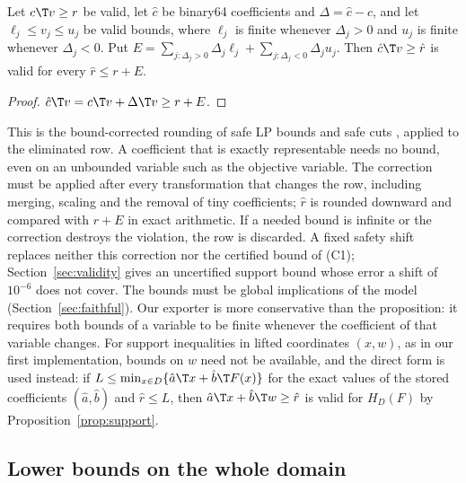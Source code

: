 \begin{proposition}\label{prop:export}
Let $c\T v\ge r$ be valid, let $\hat c$ be binary64 coefficients and
$\Delta=\hat c-c$, and let $\ell_j\le v_j\le u_j$ be valid bounds, where
$\ell_j$ is finite whenever $\Delta_j>0$ and $u_j$ is finite whenever
$\Delta_j<0$. Put
$E=\sum_{j:\Delta_j>0}\Delta_j\ell_j+\sum_{j:\Delta_j<0}\Delta_ju_j$. Then
$\hat c\T v\ge\hat r$ is valid for every $\hat r\le r+E$.
\end{proposition}

\begin{proof}
$\hat c\T v=c\T v+\Delta\T v\ge r+E$.
\end{proof}

This is the bound-corrected rounding of safe LP bounds and safe cuts
\citep{NeumaierShcherbina2004,CookEtAl2009SafeCuts,EiflerGleixner2024},
applied to the eliminated row. A coefficient that is exactly representable
needs no bound, even on an unbounded variable such as the objective variable.
The correction must be applied after every transformation that changes the
row, including merging, scaling and the removal of tiny coefficients; $\hat r$
is rounded downward and compared with $r+E$ in exact arithmetic. If a needed
bound is infinite or the correction destroys the violation, the row is
discarded. A fixed safety shift replaces neither this correction nor the
certified bound of (C1); Section~\ref{sec:validity} gives an uncertified
support bound whose error a shift of $10^{-6}$ does not cover. The bounds
must be global implications of the model (Section~\ref{sec:faithful}). Our
exporter is more conservative than the proposition: it requires both bounds
of a variable to be finite whenever the coefficient of that variable changes.
For support inequalities in lifted coordinates $(x,w)$, as in our first
implementation, bounds on $w$ need not be available, and the direct form is
used instead: if $L\le\min_{x\in D}\{\hat a\T x+\hat b\T F(x)\}$ for the exact
values of the stored coefficients $(\hat a,\hat b)$ and $\hat r\le L$, then
$\hat a\T x+\hat b\T w\ge\hat r$ is valid for $H_D(F)$ by
Proposition~\ref{prop:support}.

\subsection{Lower bounds on the whole domain}\label{sec:bounds}

